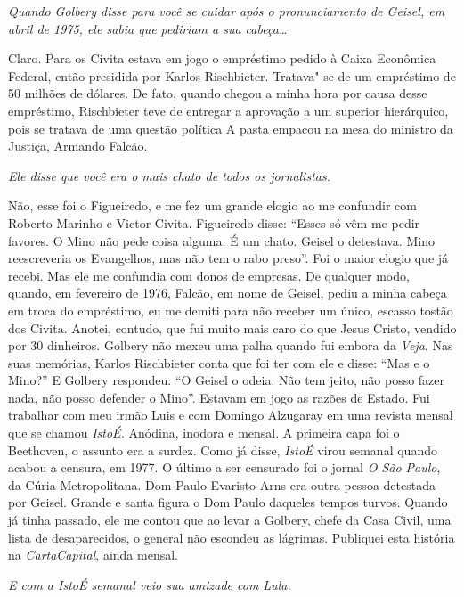 \itshape
 Quando Golbery disse para você se cuidar após o
pronunciamento de Geisel, em abril de 1975, ele sabia que pediriam a sua
cabeça…

\normalfont
Claro. Para os Civita estava em jogo o empréstimo pedido
à Caixa Econômica Federal, então presidida por Karlos Rischbieter.
Tratava"-se de um empréstimo de 50 milhões de dólares. De fato, quando
chegou a minha hora por causa desse empréstimo, Rischbieter teve de
entregar a aprovação a um superior hierárquico, pois se tratava de uma
questão política A pasta empacou na mesa do ministro da Justiça, Armando
Falcão.

\itshape
 Ele disse que você era o mais chato de todos os
jornalistas.

\normalfont
Não, esse foi o Figueiredo, e me fez um grande elogio ao
me confundir com Roberto Marinho e Victor Civita. Figueiredo disse:
``Esses só vêm me pedir favores. O Mino não pede coisa alguma. É um
chato. Geisel o detestava. Mino reescreveria os Evangelhos, mas não tem
o rabo preso''. Foi o maior elogio que já recebi. Mas ele me confundia
com donos de empresas. De qualquer modo, quando, em fevereiro de 1976,
Falcão, em nome de Geisel, pediu a minha cabeça em troca do empréstimo,
eu me demiti para não receber um único, escasso tostão dos Civita.
Anotei, contudo, que fui muito mais caro do que Jesus Cristo, vendido
por 30 dinheiros. Golbery não mexeu uma palha quando fui embora da
\emph{Veja}. Nas suas memórias, Karlos Rischbieter conta que foi ter com
ele e disse: ``Mas e o Mino?'' E Golbery respondeu: ``O Geisel o odeia.
Não tem jeito, não posso fazer nada, não posso defender o Mino''.
Estavam em jogo as razões de Estado. Fui trabalhar com meu irmão Luis e
com Domingo Alzugaray em uma revista mensal que se chamou \emph{IstoÉ.}
Anódina, inodora e mensal. A primeira capa foi o Beethoven, o assunto
era a surdez. Como já disse, \emph{IstoÉ} virou semanal quando acabou a
censura, em 1977. O último a ser censurado foi o jornal \emph{O São
Paulo}, da Cúria Metropolitana. Dom Paulo Evaristo Arns era outra pessoa
detestada por Geisel. Grande e santa figura o Dom Paulo daqueles tempos
turvos. Quando já tinha passado, ele me contou que ao levar a Golbery,
chefe da Casa Civil, uma lista de desaparecidos, o general não escondeu
as lágrimas. Publiquei esta história na \emph{CartaCapital}, ainda
mensal.

\itshape
 E com a \emph{IstoÉ} semanal veio sua amizade com Lula.

